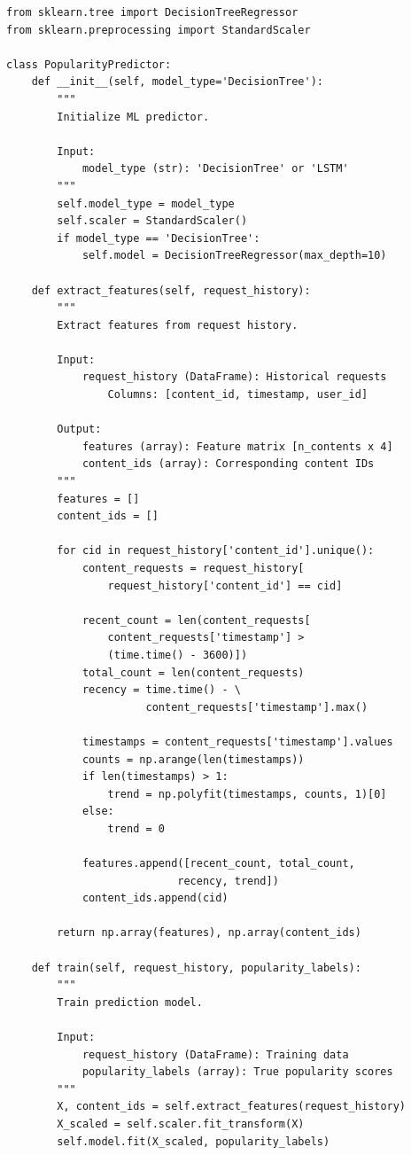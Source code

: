 \documentclass[12pt,a4paper]{article}
\begin{document}
\begin{verbatim}
from sklearn.tree import DecisionTreeRegressor
from sklearn.preprocessing import StandardScaler

class PopularityPredictor:
    def __init__(self, model_type='DecisionTree'):
        """
        Initialize ML predictor.
        
        Input:
            model_type (str): 'DecisionTree' or 'LSTM'
        """
        self.model_type = model_type
        self.scaler = StandardScaler()
        if model_type == 'DecisionTree':
            self.model = DecisionTreeRegressor(max_depth=10)
    
    def extract_features(self, request_history):
        """
        Extract features from request history.
        
        Input:
            request_history (DataFrame): Historical requests
                Columns: [content_id, timestamp, user_id]
        
        Output:
            features (array): Feature matrix [n_contents x 4]
            content_ids (array): Corresponding content IDs
        """
        features = []
        content_ids = []
        
        for cid in request_history['content_id'].unique():
            content_requests = request_history[
                request_history['content_id'] == cid]
            
            recent_count = len(content_requests[
                content_requests['timestamp'] > 
                (time.time() - 3600)])
            total_count = len(content_requests)
            recency = time.time() - \
                      content_requests['timestamp'].max()
            
            timestamps = content_requests['timestamp'].values
            counts = np.arange(len(timestamps))
            if len(timestamps) > 1:
                trend = np.polyfit(timestamps, counts, 1)[0]
            else:
                trend = 0
            
            features.append([recent_count, total_count, 
                           recency, trend])
            content_ids.append(cid)
        
        return np.array(features), np.array(content_ids)
    
    def train(self, request_history, popularity_labels):
        """
        Train prediction model.
        
        Input:
            request_history (DataFrame): Training data
            popularity_labels (array): True popularity scores
        """
        X, content_ids = self.extract_features(request_history)
        X_scaled = self.scaler.fit_transform(X)
        self.model.fit(X_scaled, popularity_labels)
    

\end{verbatim}
\end{document}
